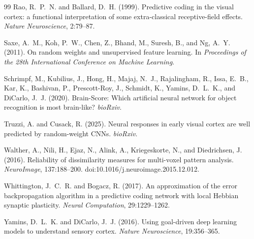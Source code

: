\documentclass[10pt,twocolumn]{article}
\begin{document}
\begin{thebibliography}{99}
Rao, R.~P.~N. and Ballard, D.~H. (1999).
Predictive coding in the visual cortex: a functional interpretation of some extra-classical receptive-field effects.
\textit{Nature Neuroscience}, 2:79--87.

Saxe, A.~M., Koh, P.~W., Chen, Z., Bhand, M., Suresh, B., and Ng, A.~Y. (2011).
On random weights and unsupervised feature learning.
In \textit{Proceedings of the 28th International Conference on Machine Learning}.

Schrimpf, M., Kubilius, J., Hong, H., Majaj, N.~J., Rajalingham, R., Issa, E.~B., Kar, K., Bashivan, P., Prescott-Roy, J., Schmidt, K., Yamins, D.~L.~K., and DiCarlo, J.~J. (2020).
Brain-Score: Which artificial neural network for object recognition is most brain-like?
\textit{bioRxiv}.

Truzzi, A. and Cusack, R. (2025).
Neural responses in early visual cortex are well predicted by random-weight CNNs.
\textit{bioRxiv}.

Walther, A., Nili, H., Ejaz, N., Alink, A., Kriegeskorte, N., and Diedrichsen, J. (2016).
Reliability of dissimilarity measures for multi-voxel pattern analysis.
\textit{NeuroImage}, 137:188--200. doi:10.1016/j.neuroimage.2015.12.012.

Whittington, J.~C.~R. and Bogacz, R. (2017).
An approximation of the error backpropagation algorithm in a predictive coding network with local Hebbian synaptic plasticity.
\textit{Neural Computation}, 29:1229--1262.

Yamins, D.~L.~K. and DiCarlo, J.~J. (2016).
Using goal-driven deep learning models to understand sensory cortex.
\textit{Nature Neuroscience}, 19:356--365.

\end{thebibliography}
\end{document}
